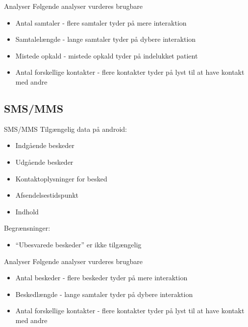 {\aauwavesbg%
\begin{frame}{Analyser} %
Følgende analyser vurderes brugbare
\begin{itemize}
	\item Antal samtaler - flere samtaler tyder på mere interaktion
	\item Samtalelængde - lange samtaler tyder på dybere interaktion
	\item Mistede opkald - mistede opkald tyder på indelukket patient
	\item Antal forskellige kontakter - flere kontakter tyder på lyst til at have kontakt med andre
\end{itemize}
	
\end{frame}}

\subsection{SMS/MMS}
{\aauwavesbg%
\begin{frame}{SMS/MMS} %
Tilgængelig data på android:
\begin{itemize}
	\item Indgående beskeder
	\item Udgående beskeder
	\item Kontaktoplysninger for besked
	\item Afsendelsestidspunkt
	\item Indhold
\end{itemize}

Begrænsninger:
\begin{itemize}
	\item ``Ubesvarede beskeder'' er ikke tilgængelig
\end{itemize}
\end{frame}}

{\aauwavesbg%
	\begin{frame}{Analyser} %
		Følgende analyser vurderes brugbare
		\begin{itemize}
			\item Antal beskeder - flere beskeder tyder på mere interaktion
			\item Beskedlængde - lange samtaler tyder på dybere interaktion
			\item Antal forskellige kontakter - flere kontakter tyder på lyst til at have kontakt med andre
		\end{itemize}
		
	\end{frame}}
	




